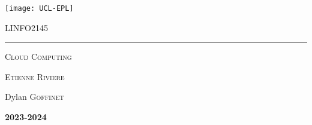 \documentclass{customSynthesis}
\begin{document}

\begin{titlepage}
	\flushleft\texttt{[image: UCL-EPL]}\\
	\vspace*{2cm}
	\vspace*{\fill}
	\centering
	{\scshape\LARGE LINFO2145 \par}
	\vspace{0.4cm}
	{\color{clearBlue}\rule{0.7\textwidth}{1pt}\par}
	\vspace{0.5cm}
	{\scshape\Large Cloud Computing \par}
	\vspace{0.5cm}
	{\scshape\large Etienne Riviere\par}
	\vspace{1cm}
	{\scshape\large  \par} %
	{\Large\itshape\par}
	\vspace*{\fill}
	\vfill
	\vfill
	{\Large Dylan \textsc{Goffinet}\par}
	\vspace{0.5cm}
	{\Large\bfseries 2023-2024\par}
	{\large \par}
\end{titlepage}


\setcounter{tocdepth}{2} %
\tableofcontents
\thispagestyle{empty} %
\clearpage
{}




\end{document}
